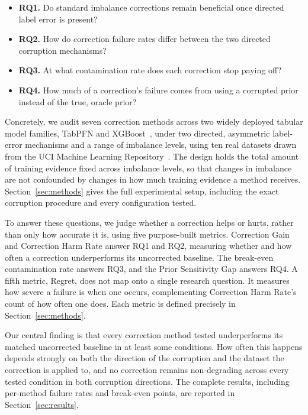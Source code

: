 \begin{itemize}
\item \textbf{RQ1.} Do standard imbalance corrections remain beneficial once
directed label error is present?
\item \textbf{RQ2.} How do correction failure rates differ between the two
directed corruption mechanisms?
\item \textbf{RQ3.} At what contamination rate does each correction stop paying off?
\item \textbf{RQ4.} How much of a correction's failure comes from using a
corrupted prior instead of the true, oracle prior?
\end{itemize}

Concretely, we audit seven correction methods across two widely deployed tabular
model families, TabPFN and XGBoost~\cite{chen2016xgboost}, under two directed,
asymmetric label-error mechanisms and a range of imbalance levels, using ten real
datasets drawn from the UCI Machine Learning Repository~\cite{kelly_uci}. The design
holds the total amount of training evidence fixed across imbalance levels, so that
changes in imbalance are not confounded by changes in how much training evidence a
method receives. Section~\ref{sec:methods} gives the full experimental setup, including
the exact corruption procedure and every configuration tested.

To answer these questions, we judge whether a correction helps or hurts, rather
than only how accurate it is, using five purpose-built metrics. Correction Gain and
Correction Harm Rate answer RQ1 and RQ2, measuring whether and how often a
correction underperforms its uncorrected baseline. The break-even contamination
rate answers RQ3, and the Prior Sensitivity Gap answers RQ4. A fifth metric,
Regret, does not map onto a single research question. It measures how severe a
failure is when one occurs, complementing Correction Harm Rate's count of how
often one does. Each metric is defined precisely in Section~\ref{sec:methods}.

Our central finding is that every correction method tested underperforms its
matched uncorrected baseline in at least some conditions. How often this happens
depends strongly on both the direction of the corruption and the dataset the
correction is applied to, and no correction remains non-degrading across every
tested condition in both corruption directions. The complete results, including
per-method failure rates and break-even points, are reported in
Section~\ref{sec:results}.

